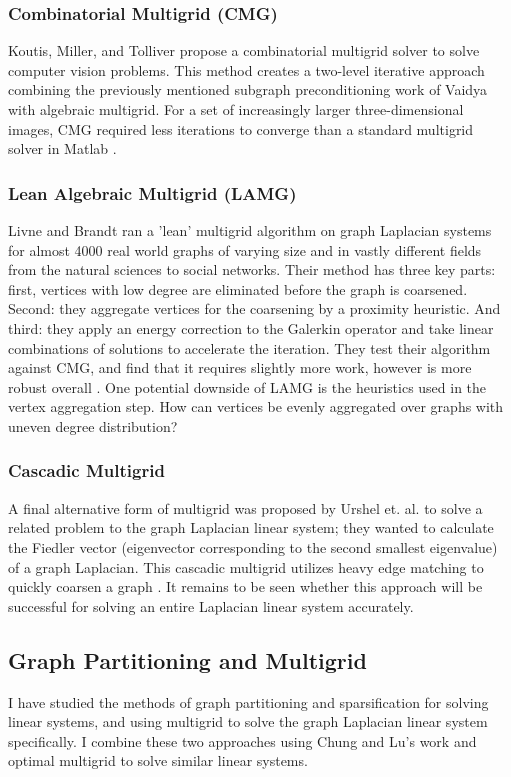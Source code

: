 \documentclass{article}
\begin{document}
\subsubsection{Combinatorial Multigrid (CMG)}
Koutis, Miller, and Tolliver propose a combinatorial multigrid solver to solve computer vision problems. This method creates a two-level iterative approach combining the previously mentioned subgraph preconditioning work of Vaidya with algebraic multigrid. For a set of increasingly larger three-dimensional images, CMG required less iterations to converge than a standard multigrid solver in Matlab \cite{Koutis:2011}.

\subsubsection{Lean Algebraic Multigrid (LAMG)}
Livne and Brandt ran a 'lean' multigrid algorithm on graph Laplacian systems for almost 4000 real world graphs of varying size and in vastly different fields from the natural sciences to social networks. Their method has three key parts: first, vertices with low degree are eliminated before the graph is coarsened. Second: they aggregate vertices for the coarsening by a proximity heuristic. And third: they apply an energy correction to the Galerkin operator and take linear combinations of solutions to
accelerate the iteration. They test their algorithm against CMG, and find that it requires slightly more work, however is more robust overall \cite{Livne:2012}. One potential downside of LAMG is
the heuristics used in the vertex aggregation step. How can vertices be evenly aggregated over graphs with uneven degree distribution?


\subsubsection{Cascadic Multigrid}
A final alternative form of multigrid was proposed by Urshel et. al. to solve a related problem to the graph Laplacian linear system; they wanted to calculate the Fiedler vector (eigenvector corresponding to the second smallest eigenvalue) of a graph Laplacian. This cascadic multigrid utilizes heavy edge matching to quickly coarsen a graph \cite{Urschel:2014}. It remains to be seen whether this approach will be successful for solving an entire Laplacian linear system accurately.

\subsection{Graph Partitioning and Multigrid}
I have studied the methods of graph partitioning and sparsification for solving linear systems, and using multigrid to solve the graph Laplacian linear system specifically. I combine these two approaches using Chung and Lu's work \cite{Chung:2004} and optimal multigrid to solve similar linear systems.
%
%
\end{document}
